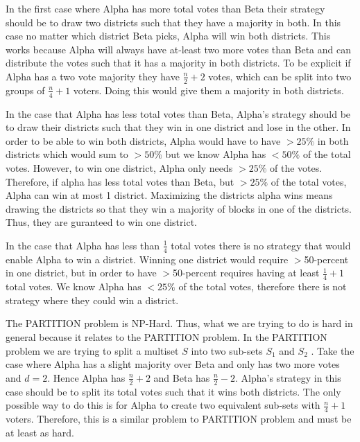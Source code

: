 \documentclass[12pt]{article}%
\begin{document}
In the first case where Alpha has more total votes than Beta their strategy should be to draw two districts such that they have a majority in both.  In this case no matter which district Beta picks, Alpha will win both districts.  This works because Alpha will always have at-least two more votes than Beta and can distribute the votes such that it has a majority in both districts.  To be explicit if Alpha has a two vote majority they have $\frac{n}{2} + 2$ votes, which can be split into two groups of $\frac{n}{4} + 1$ voters.  Doing this would give them a majority in both districts.
\newline

In the case that Alpha has less total votes than Beta, Alpha's strategy should be to draw their districts such that they win in one district and lose in the other. In order to be able to win both districts, Alpha would have to have $> 25 \%$ in both districts which would sum to $> 50\%$ but we know Alpha has $ < 50\%$ of the total votes. However, to win one district, Alpha only needs $> 25\%$ of the votes. Therefore, if alpha has less total votes than Beta, but $> 25\%$ of the total votes, Alpha can win at most 1 district. Maximizing the districts alpha wins means drawing the districts so that they win a majority of blocks in one of the districts. Thus, they are guranteed to win one district.
\newline

In the case that Alpha has less than $\frac{1}{4}$ total votes there is no strategy that would enable Alpha to win a district. Winning one district would require $>$50-percent in one district, but in order to have $>$50-percent requires having at least $\frac{1}{4} + 1$ total votes. We know Alpha has $< 25\%$ of the total votes, therefore there is not strategy where they could win a district.
\newline

The PARTITION problem is NP-Hard.  Thus, what we are trying to do is hard in general because it relates to the PARTITION problem. In the PARTITION problem we are trying to split a multiset $S$ into two sub-sets $S_1$ and $S_2$ .  Take the case where Alpha has a slight majority over Beta and only has two more votes and $d=2$.  Hence Alpha has $\frac{n}{2} + 2$ and Beta has $\frac{n}{2} - 2$.  Alpha's strategy in this case should be to split its total votes such that it wins both districts.  The only possible way to do this is for Alpha to create two equivalent sub-sets with  $\frac{n}{4} + 1$ voters.  Therefore, this is a similar problem to PARTITION problem and must be at least as hard.
\end{document}
